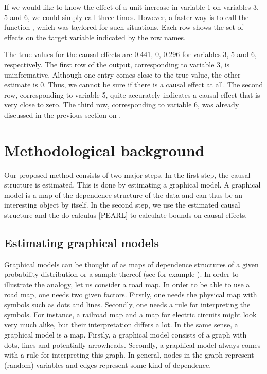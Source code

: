 \documentclass[article]{jss}
\begin{document}
If we would like to know the effect of a unit increase in variable 1 on
variables 3, 5 and 6, we could simply call  three times. However,
a faster way is to call the function , which was taylored for
such situations. Each row shows the set of effects on the target variable
indicated by the row names.

The true values for the causal effects are 0.441, 0, 0.296 for variables
3, 5 and 6, respectively. The first row of the output, corresponding to
variable 3, is uninformative. Although one entry comes close to the true
value, the other estimate is 0. Thus, we cannot be sure if there is a
causal effect at all. The second row, corresponding to variable 5, quite
accurately indicates a causal effect that is very close to zero. The third
row, corresponding to variable 6, was already discussed in the
previous section on .

\section{Methodological background}
Our proposed method consists of two major steps. In the first step, the
causal structure is estimated. This is done by estimating a graphical
model. A graphical model is a map of the dependence structure of the data
and can thus be an interesting object by itself. In the second step, we use
the estimated causal structure and the do-calculus [PEARL] to calculate
bounds on causal effects.

\subsection{Estimating graphical models}
Graphical models can be thought of as maps of dependence structures of a
given probability distribution or a sample thereof (see for example
\cite{lauritzen}). In order to illustrate the analogy, let us consider a
road map. In order to be able to use a road map, one needs two given
factors. Firstly, one needs the physical map with symbols such as dots and
lines. Secondly, one needs a rule for interpreting the symbols. For
instance, a railroad map and a map for electric circuits might look very
much alike, but their interpretation differs a lot. In the same sense, a
graphical model is a map. Firstly, a graphical model consists of a graph
with dots, lines and potentially arrowheads. Secondly, a graphical model
always comes with a rule for interpreting this graph. In general, nodes in
the graph represent (random) variables and edges represent some kind of
dependence.
\end{document}
